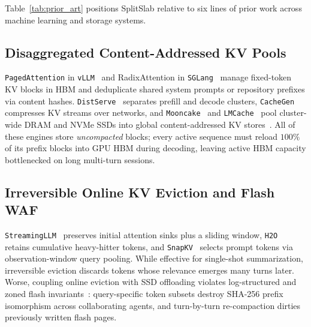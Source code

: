 \documentclass[final,5p,times,twocolumn]{elsarticle}
\theoremstyle{definition}
\theoremstyle{remark}
\newcommand{\SplitSlab}{\textup{\textsc{SplitSlab}}}
\def\SplitSlab{SplitSlab}%
\begin{document}
Table~\ref{tab:prior_art} positions \SplitSlab{} relative to six lines of prior work across machine learning and storage systems.

\subsection{Disaggregated Content-Addressed KV Pools}
\texttt{PagedAttention} in \texttt{vLLM}~\cite{kwon2023vllm} and RadixAttention in \texttt{SGLang}~\cite{zheng2024sglang} manage fixed-token KV blocks in HBM and deduplicate shared system prompts or repository prefixes via content hashes. \texttt{DistServe}~\cite{zhong2024distserve} separates prefill and decode clusters, \texttt{CacheGen}~\cite{liu2024cachegen} compresses KV streams over networks, and \texttt{Mooncake}~\cite{qin2025mooncake} and \texttt{LMCache}~\cite{cheng2025lmcache} pool cluster-wide DRAM and NVMe SSDs into global content-addressed KV stores~\cite{quinlan2002venti}. All of these engines store \emph{uncompacted} blocks; every active sequence must reload $100\%$ of its prefix blocks into GPU HBM during decoding, leaving active HBM capacity bottlenecked on long multi-turn sessions.

\subsection{Irreversible Online KV Eviction and Flash WAF}
\texttt{StreamingLLM}~\cite{xiao2024streamingllm} preserves initial attention sinks plus a sliding window, \texttt{H2O}~\cite{zhang2023h2o} retains cumulative heavy-hitter tokens, and \texttt{SnapKV}~\cite{li2024snapkv} selects prompt tokens via observation-window query pooling. While effective for single-shot summarization, irreversible eviction discards tokens whose relevance emerges many turns later. Worse, coupling online eviction with SSD offloading violates log-structured and zoned flash invariants~\cite{rosenblum1992lfs,hu2009waf,bjorling2021zns}: query-specific token subsets destroy SHA-256 prefix isomorphism across collaborating agents, and turn-by-turn re-compaction dirties previously written flash pages.
\end{document}
